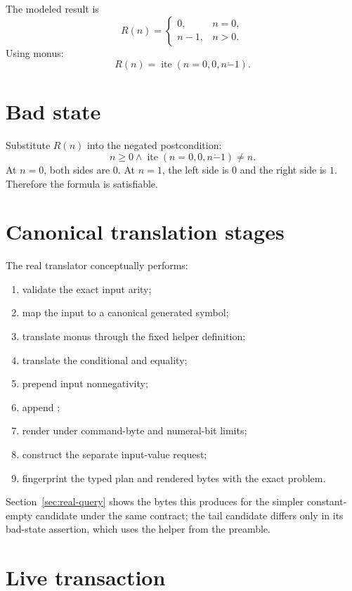 \documentclass[10pt,letterpaper,oneside]{report}
\newcommand{\code}[1]{\texttt{\detokenize{#1}}}
\begin{document}
The modeled result is
\[
  R(n)=
  \begin{cases}
  0,&n=0,\\
  n-1,&n>0.
  \end{cases}
\]
Using monus:
\[
  R(n)=\operatorname{ite}(n=0,0,n\mathbin{\dot{-}}1).
\]

\section{Bad state}

Substitute $R(n)$ into the negated postcondition:
\[
  n\ge0\land
  \operatorname{ite}(n=0,0,n\mathbin{\dot{-}}1)\ne n.
\]
At $n=0$, both sides are $0$. At $n=1$, the left side is $0$ and the right side is $1$. Therefore the formula is satisfiable.

\section{Canonical translation stages}

The real translator conceptually performs:

\begin{enumerate}
\item validate the exact input arity;
\item map the input to a canonical generated symbol;
\item translate monus through the fixed helper definition;
\item translate the conditional and equality;
\item prepend input nonnegativity;
\item append \code{check-sat};
\item render under command-byte and numeral-bit limits;
\item construct the separate input-value request;
\item fingerprint the typed plan and rendered bytes with the exact problem.
\end{enumerate}

Section~\ref{sec:real-query} shows the bytes this produces for the simpler constant-empty candidate under the same contract; the tail candidate differs only in its bad-state assertion, which uses the \code{djex_nat_monus} helper from the preamble.

\section{Live transaction}
\end{document}
